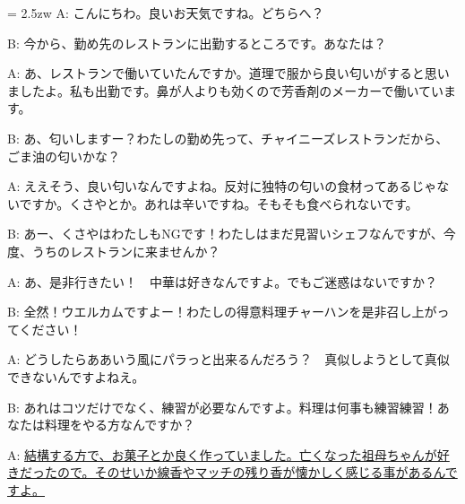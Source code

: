 \documentclass[11pt]{amsart}
\title{}
\author{}
\newenvironment{hangall}[1]{\hangindent = 2.5zw\everypar{\hangindent = 2.5zw}}{}
\begin{document}
\maketitle
\begin{hangall}{}%
A: こんにちわ。良いお天気ですね。どちらへ？

B: 今から、勤め先のレストランに出勤するところです。あなたは？

A: あ、レストランで働いていたんですか。道理で服から良い匂いがすると思いましたよ。私も出勤です。鼻が人よりも効くので芳香剤のメーカーで働いています。

B: あ、匂いしますー？わたしの勤め先って、チャイニーズレストランだから、ごま油の匂いかな？

A: ええそう、良い匂いなんですよね。反対に独特の匂いの食材ってあるじゃないですか。くさやとか。あれは辛いですね。そもそも食べられないです。

B: あー、くさやはわたしもNGです！わたしはまだ見習いシェフなんですが、今度、うちのレストランに来ませんか？

A: あ、是非行きたい！　中華は好きなんですよ。でもご迷惑はないですか？

B: 全然！ウエルカムですよー！わたしの得意料理チャーハンを是非召し上がってください！

A: どうしたらああいう風にパラっと出来るんだろう？　真似しようとして真似できないんですよねえ。

B: あれはコツだけでなく、練習が必要なんですよ。料理は何事も練習練習！あなたは料理をやる方なんですか？

A: \ul{結構する方で、お菓子とか良く作っていました。亡くなった祖母ちゃんが好きだったので。そのせいか線香やマッチの残り香が懐かしく感じる事があるんですよ。}\end{hangall}
\end{document}
